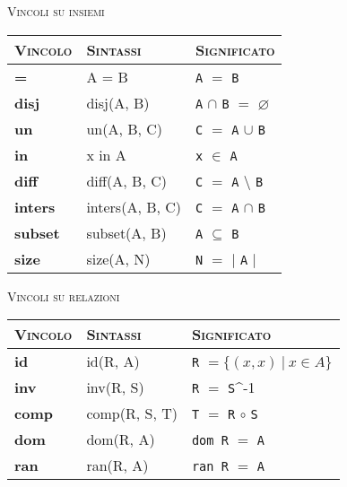 \begin{table}[h]
\textsc{Vincoli su insiemi}\\

\begin{tabular}{|l|l|l|}
\hline
\textsc{Vincolo} & \textsc{Sintassi}                	& \textsc{Significato}                               	\\ \hline
\textbf{=}       & A = B                             	& \texttt{A} $=$ \texttt{B}                      	\\ \hline
\textbf{disj}    & disj(A, B)                        	& \texttt{A} $\cap$ \texttt{B} $=$ $\varnothing$ 	\\ \hline
\textbf{un}      & un(A, B, C) 	                        & \texttt{C} $=$ \texttt{A} $\cup$ \texttt{B}	  	\\ \hline
\textbf{in}      & x in A                           	& \texttt{x} $\in$ \texttt{A}                    	\\ \hline
\textbf{diff}    & diff(A, B, C)                    	& \texttt{C} $=$ \texttt{A} $\setminus$ \texttt{B}   \\ \hline
\textbf{inters}  & inters(A, B, C)                  	& \texttt{C} $=$ \texttt{A} $\cap$ \texttt{B}        \\ \hline
\textbf{subset}  & subset(A, B) 				       	& \texttt{A} $\subseteq$ \texttt{B}                  \\ \hline
\textbf{size}    & size(A, N)					       	& \texttt{N} $=$ $|$ \texttt{A} $|$              	\\ \hline
\end{tabular}
\end{table}




\begin{table}[h]
\newline
\vspace*{1 cm}
\newline
\textsc{Vincoli su relazioni}\\

\begin{tabular}{|l|l|l|}
\hline
\textsc{Vincolo} & \textsc{Sintassi}              	    & \textsc{Significato}                               	\\ \hline
\textbf{id}      & id(R, A)							    & \texttt{R} $= \{(x, x) \:| \: x \in A \}$  	\\ \hline
\textbf{inv}     & inv(R, S)           					& \texttt{R} $=$ \texttt{S}^{-1} 	\\ \hline
\textbf{comp}    & comp(R, S, T)                        & \texttt{T} $=$ \texttt{R} $\circ$ \texttt{S}	\\ \hline
\textbf{dom}     & dom(R, A)       					    & \texttt{dom R} $=$ \texttt{A} 	\\ \hline
\textbf{ran}     & ran(R, A)          					& \texttt{ran R} $=$ \texttt{A}	\\ \hline
\end{tabular}
\end{table}

